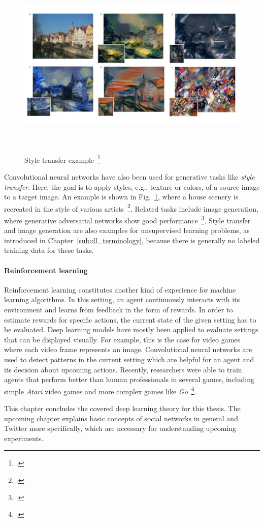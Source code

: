 \begin{figure}[h]
  \includegraphics[height=9cm]{img/style_transfer.jpg}
  \caption[Style transfer example]{Style transfer example~\footcite{Gatys2015}}
\label{fig:style_transfer}
\end{figure}

Convolutional neural networks have also been used for generative tasks like
\textit{style transfer}.
Here, the goal is to apply styles, e.g., texture or colors, of a source image to a target image.
An example is shown in Fig.~\ref{fig:style_transfer}, where a house scenery is
recreated in the style of various artists~\footcite{Gatys2015}.
Related tasks include image generation, where generative adversarial networks
show good performance~\footcite{Radford2015}.
Style transfer and image generation are also examples for unsupervised learning
problems, as introduced in Chapter~\ref{sub:dl_terminology}, because there is
generally no labeled training data for these tasks.

\paragraph{Reinforcement learning}
\label{sub:dl_app_rl}

Reinforcement learning constitutes another kind of experience for machine
learning algorithms.
In this setting, an agent continuously interacts with its environment and learns
from feedback in the form of rewards.
In order to estimate rewards for specific actions, the current state of the
given setting has to be evaluated.
Deep learning models have mostly been applied to evaluate settings that can
be displayed visually.
For example, this is the case for video games where each video frame represents an image.
Convolutional neural networks are used to detect patterns in the current
setting which are helpful for an agent and its decision about upcoming
actions.
Recently, researchers were able to train agents that perform better than human
professionals in several games, including simple \textit{Atari} video games
and more complex games like \textit{Go}~\footcite{Mnih2015, Silver2016}.

This chapter concludes the covered deep learning theory for this thesis.
The upcoming chapter explains basic concepts of social networks in general and
Twitter more specifically, which are necessary for understanding
upcoming experiments.
